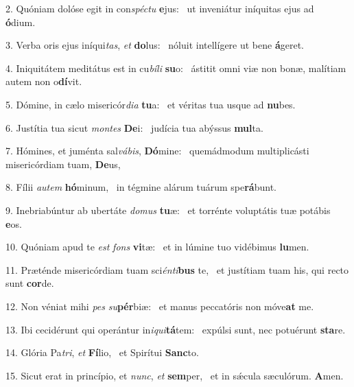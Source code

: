 2. Quóniam dolóse egit in con\textit{spéc}\textit{tu} \textbf{e}jus: \ast\  ut inveniátur iníquitas ejus ad \textbf{ó}dium.\

3. Verba oris ejus iníqui\textit{tas}, \textit{et} \textbf{do}lus: \ast\  nóluit intellígere ut bene \textbf{á}geret.\

4. Iniquitátem meditátus est in cu\textit{bí}\textit{li} \textbf{su}o: \ast\  ástitit omni viæ non bonæ, malítiam autem non o\textbf{dí}vit.\

5. Dómine, in cælo misericór\textit{di}\textit{a} \textbf{tu}a: \ast\  et véritas tua usque ad \textbf{nu}bes.\

6. Justítia tua sicut \textit{mon}\textit{tes} \textbf{De}i: \ast\  judícia tua abýssus \textbf{mul}ta.\

7. Hómines, et juménta sal\textit{vá}\textit{bis}, \textbf{Dó}mine: \ast\  quemádmodum multiplicásti misericórdiam tuam, \textbf{De}us,\

8. Fílii \textit{au}\textit{tem} \textbf{hó}minum, \ast\  in tégmine alárum tuárum spe\textbf{rá}bunt.\

9. Inebriabúntur ab ubertáte \textit{do}\textit{mus} \textbf{tu}æ: \ast\  et torrénte voluptátis tuæ potábis \textbf{e}os.\

10. Quóniam apud te \textit{est} \textit{fons} \textbf{vi}tæ: \ast\  et in lúmine tuo vidébimus \textbf{lu}men.\

11. Præténde misericórdiam tuam sci\textit{én}\textit{ti}\textbf{bus} te, \ast\  et justítiam tuam his, qui recto sunt \textbf{cor}de.\

12. Non véniat mihi \textit{pes} \textit{su}\textbf{pér}biæ: \ast\  et manus peccatóris non móve\textbf{at} me.\

13. Ibi cecidérunt qui operántur in\textit{i}\textit{qui}\textbf{tá}tem: \ast\  expúlsi sunt, nec potuérunt \textbf{sta}re.\

14. Glória Pa\textit{tri}, \textit{et} \textbf{Fí}lio, \ast\  et Spirítui \textbf{Sanc}to.\

15. Sicut erat in princípio, et \textit{nunc}, \textit{et} \textbf{sem}per, \ast\  et in sǽcula sæculórum. \textbf{A}men.\

